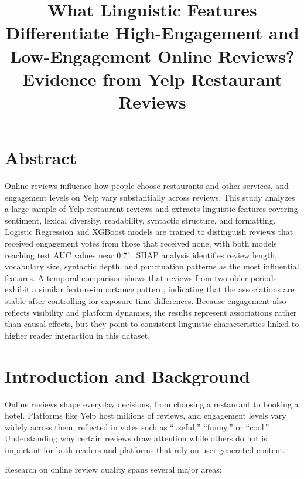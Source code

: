 \documentclass[12pt]{article}
\title{What Linguistic Features Differentiate High-Engagement and Low-Engagement Online Reviews? Evidence from Yelp Restaurant Reviews}
\begin{document}
\maketitle

\fontsize{12pt}{12pt}\selectfont

\section*{Abstract}

Online reviews influence how people choose restaurants and other services, and engagement levels on Yelp vary substantially across reviews. 
This study analyzes a large sample of Yelp restaurant reviews and extracts linguistic features covering sentiment, lexical diversity, readability, syntactic structure, 
and formatting. Logistic Regression and XGBoost models are trained to distinguish reviews that received engagement votes from those that received none, 
with both models reaching test AUC values near 0.71. SHAP analysis identifies review length, vocabulary size, syntactic depth, and punctuation patterns as the most influential features. A temporal comparison shows that reviews from two older periods exhibit a similar feature-importance pattern, indicating that the associations are stable after controlling for exposure-time differences. Because engagement also reflects visibility and platform dynamics, the results represent associations rather than causal effects, 
but they point to consistent linguistic characteristics linked to higher reader interaction in this dataset.

\section{Introduction and Background}

Online reviews shape everyday decisions, from choosing a restaurant to booking a hotel. 
Platforms like Yelp host millions of reviews, and engagement levels vary widely across them, reflected in votes such as “useful,” “funny,” 
or “cool.” Understanding why certain reviews draw attention while others do not is important for both readers and platforms that rely on 
user-generated content.
 
Research on online review quality spans several major areas:
\end{document}
